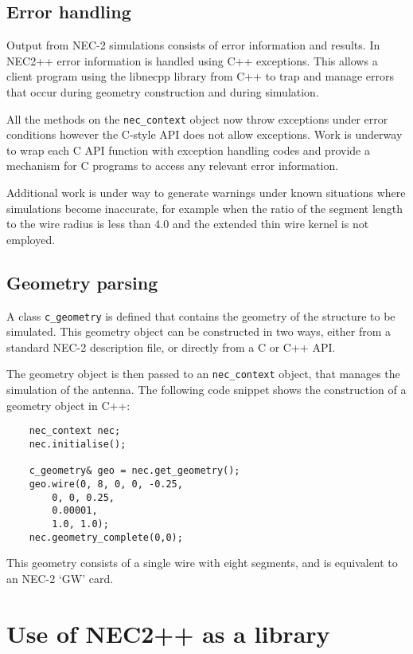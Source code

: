 \documentclass{report}
\begin{document}
\subsection{Error handling}

Output from NEC-2 simulations consists of error information and results. In NEC2++ error information is  handled using C++ exceptions. This allows a client program using the libnecpp library from C++ to trap and manage errors that occur during geometry construction and during simulation. 

All the methods on the {\tt nec\_context} object now throw exceptions under error conditions however the C-style API does not allow exceptions. Work is underway to wrap each C API function with exception handling codes and provide a mechanism for C programs to access any relevant error information.

Additional work is under way to generate warnings under known situations where simulations become inaccurate, for example when the ratio of the segment length to the wire radius is less than 4.0 and the extended thin wire kernel is not employed.

\subsection{Geometry parsing}

A class {\tt c\_geometry} is defined that contains the geometry of the structure to be simulated. This geometry object can be constructed in two ways, either from a standard NEC-2 description file, or directly from a C or C++ API.

The geometry object is then passed to an {\tt nec\_context} object, that manages the simulation of the antenna. The following code snippet shows the construction of a geometry object in C++:
\begin{lstlisting}
	nec_context nec;
	nec.initialise();
	
	c_geometry& geo = nec.get_geometry();
	geo.wire(0, 8, 0, 0, -0.25,
		0, 0, 0.25,
		0.00001, 
		1.0, 1.0);
	nec.geometry_complete(0,0);
\end{lstlisting}
This geometry consists of a single wire with eight segments, and is equivalent to an NEC-2 `GW' card.

\section{Use of NEC2++ as a library}
\label{sec_example}
\end{document}
